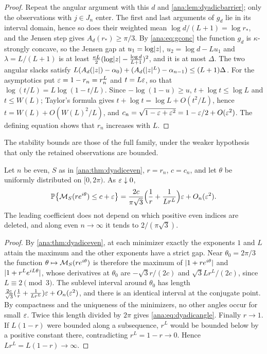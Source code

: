 \begin{proof}
Repeat the angular argument with this $d$ and \cref{ana:lem:dyadicbarrier}; only the
observations with $j\in J_n$ enter. The first and last arguments of $g_d$ lie in its interval
domain, hence so does their weighted mean $\log d/(L+1)=\log r_*$, and the Jensen step gives
$A_d(r_*)\ge\pi/3$. By
\eqref{ana:eq:gconc} the function $g_d$ is $\kappa$-strongly concave, so the Jensen gap at
$u_1=\log\lvert z\rvert$, $u_2=\log d-Lu_1$ and $\lambda=L/(L+1)$ is at least
$\frac{\kappa L}2(\log\lvert z\rvert-\frac{\log d}{L+1})^2$, and it is at most $\Delta$. The two
angular slacks satisfy $L(A_d(\lvert z\rvert)-\alpha_0)+(A_d(\lvert z\rvert^L)-\alpha_{n-1})\le(L+1)\Delta$.
For the asymptotics put $\varepsilon=1-r_n=r_n^L$ and $t=L\varepsilon$, so that
$\log(t/L)=L\log(1-t/L)$. Since $-\log(1-u)\ge u$, $t+\log t\le\log L$ and $t\le W(L)$;
Taylor's formula gives $t+\log t=\log L+O(t^2/L)$, hence $t=W(L)+O(W(L)^2/L)$, and
$c_n=\sqrt{1-\varepsilon+\varepsilon^2}=1-\varepsilon/2+O(\varepsilon^2)$. The defining equation shows that $r_n$
increases with $L$.
\end{proof}

The stability bounds are those of the full family, under the weaker hypothesis that only the
retained observations are bounded.

\begin{theorem}\label{ana:thm:dyadicangle}
Let $n$ be even, $S$ as in \cref{ana:thm:dyadiceven}, $r=r_n$, $c=c_n$, and let $\theta$ be
uniformly distributed on $[0,2\pi)$. As $\varepsilon\downarrow0$,
\begin{equation}\label{ana:eq:dyadicangle}
 \mathbb{P}\bigl\{\mathcal{M}_S(re^{i\theta})\le c+\varepsilon\bigr\}
 =\frac{2c}{\pi\sqrt3}\Bigl(\frac1r+\frac1{Lr^L}\Bigr)\varepsilon+O_n(\varepsilon^2).
\end{equation}
The leading coefficient does not depend on which positive even indices are deleted, and
along even $n\to\infty$ it tends to $2/(\pi\sqrt3)$.
\end{theorem}

\begin{proof}
By \cref{ana:thm:dyadiceven}, at each minimizer exactly the exponents $1$ and $L$ attain the
maximum and the other exponents have a strict gap. Near $\theta_0=2\pi/3$ the function
$\theta\mapsto\mathcal{M}_S(re^{i\theta})$ is therefore the maximum of $\lvert1+re^{i\theta}\rvert$ and
$\lvert1+r^Le^{iL\theta}\rvert$, whose derivatives at $\theta_0$ are $-\sqrt3r/(2c)$ and
$\sqrt3Lr^L/(2c)$, since $L\equiv2\pmod3$. The sublevel interval around $\theta_0$ has length
$\frac{2c}{\sqrt3}(\frac1r+\frac1{Lr^L})\varepsilon+O_n(\varepsilon^2)$, and there is an identical interval
at the conjugate point. By compactness and the uniqueness of the minimizers, no other angles
occur for small $\varepsilon$. Twice this length divided by $2\pi$ gives \eqref{ana:eq:dyadicangle}.
Finally $r\to1$. If $L(1-r)$ were bounded along a subsequence, $r^L$ would be bounded below
by a positive constant there, contradicting $r^L=1-r\to0$. Hence $Lr^L=L(1-r)\to\infty$.
\end{proof}

